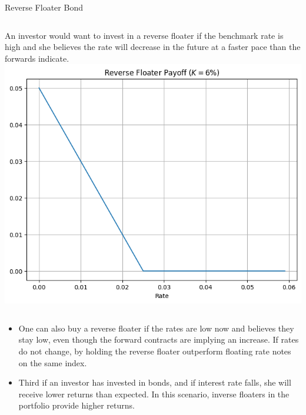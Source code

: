 \documentclass{beamer}
\begin{document}
\begin{frame}{Reverse Floater Bond}
		\begin{columns}
		An investor would want to invest in a reverse floater if the benchmark rate is high and she believes the rate will decrease in the future at a faster pace than the forwards indicate.
				\includegraphics[width=0.8\linewidth]{reverse_floater_payoff}
		\end{columns}
	\begin{itemize}
	\item<2-> One can also buy a reverse floater if the rates are low now and believes they stay low, even though the forward contracts are implying an increase. If rates do not change, by holding the reverse floater outperform floating rate notes on the same index.
	\item<3-> Third if an investor has invested in bonds, and if interest rate falls, she will receive lower returns than expected. In this scenario, inverse floaters in the portfolio provide higher returns.
	\end{itemize}
\end{frame}
\end{document}
